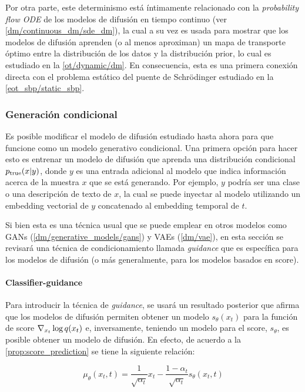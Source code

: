 Por otra parte, este determinismo está íntimamente relacionado con la \textit{probability flow ODE} de los modelos de difusión en tiempo continuo (ver \autoref{dm/continuous_dm/sde_dm}), la cual a su vez es usada para mostrar que los modelos de difusión aprenden (o al menos aproximan) un mapa de transporte óptimo entre la distribución de los datos y la distribución prior, lo cual es estudiado en la \autoref{ot/dynamic/dm}. En consecuencia, esta es una primera conexión directa con el problema estático del puente de Schrödinger estudiado en la \autoref{eot_sbp/static_sbp}.

\subsubsection{Generación condicional}

Es posible modificar el modelo de difusión estudiado hasta ahora para que funcione como un modelo generativo condicional. Una primera opción para hacer esto es entrenar un modelo de difusión que aprenda una distribución condicional $p_{\operatorname{true}}(x|y)$, donde $y$ es una entrada adicional al modelo que indica información acerca de la muestra $x$ que se está generando. Por ejemplo, $y$ podría ser una clase o una descripción de texto de $x$, la cual se puede inyectar al modelo utilizando un embedding vectorial de $y$ concatenado al embedding temporal de $t$.

Si bien esta es una técnica usual que se puede emplear en otros modelos como GANs (\autoref{dm/generative_models/gans}) y VAEs (\autoref{dm/vae}), en esta sección se revisará una técnica de condicionamiento llamada \textit{guidance} que es específica para los modelos de difusión (o más generalmente, para los modelos basados en score).

\paragraph{Classifier-guidance}

Para introducir la técnica de \textit{guidance}, se usará un resultado posterior que afirma que los modelos de difusión permiten obtener un modelo $s_\theta(x_t)$ para la función de score $\nabla_{x_t} \log q(x_t)$ e, inversamente, teniendo un modelo para el score, $s_\theta$, es posible obtener un modelo de difusión. En efecto, de acuerdo a la \autoref{prop:score_prediction} se tiene la siguiente relación:

\begin{equation*}
    \label{eq:score_mean_relationship}
    \mu_\theta(x_t,t) = \frac{1}{\sqrt{\alpha_t}}x_t - \frac{1-\alpha_t}{\sqrt{\alpha_t}}s_\theta(x_t,t)
\end{equation*}


